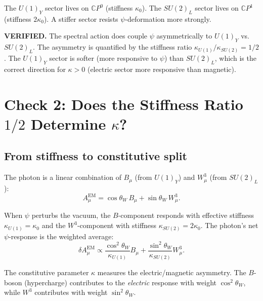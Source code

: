 \documentclass[aps,prd,twocolumn,superscriptaddress,nofootinbib]{revtex4-2}
\newcommand{\CP}{\mathbb{C}P}
\begin{document}
The $U(1)_Y$ sector lives on $\CP^0$ (stiffness $\kappa_0$).  The
$SU(2)_L$ sector lives on $\CP^1$ (stiffness $2\kappa_0$).  A stiffer
sector resists $\psi$-deformation more strongly.

\begin{tcolorbox}[colback=green!5!white, colframe=green!60!black, title=Verdict: Check 1]
\textbf{VERIFIED.}  The spectral action does couple $\psi$
asymmetrically to $U(1)_Y$ vs.\ $SU(2)_L$.  The asymmetry is
quantified by the stiffness ratio $\kappa_{U(1)}/\kappa_{SU(2)} = 1/2$.
The $U(1)_Y$ sector is softer (more responsive to $\psi$) than
$SU(2)_L$, which is the correct direction for $\kappa > 0$
(electric sector more responsive than magnetic).
\end{tcolorbox}


\section{Check 2: Does the Stiffness Ratio $1/2$ Determine $\kappa$?}
\label{sec:check2}

\subsection{From stiffness to constitutive split}

The photon is a linear combination of $B_\mu$ (from $U(1)_Y$) and
$W^3_\mu$ (from $SU(2)_L$):
\begin{equation}
A_\mu^{\mathrm{EM}} = \cos\theta_W\, B_\mu + \sin\theta_W\, W^3_\mu.
\end{equation}

When $\psi$ perturbs the vacuum, the $B$-component responds with
effective stiffness $\kappa_{U(1)} = \kappa_0$ and the $W^3$-component
with stiffness $\kappa_{SU(2)} = 2\kappa_0$.  The photon's net
$\psi$-response is the weighted average:
\begin{equation}
\delta A_\mu^{\mathrm{EM}} \propto
\frac{\cos^2\theta_W}{\kappa_{U(1)}} B_\mu
+ \frac{\sin^2\theta_W}{\kappa_{SU(2)}} W^3_\mu.
\end{equation}

The constitutive parameter $\kappa$ measures the electric/magnetic
asymmetry.  The $B$-boson (hypercharge) contributes to the
\emph{electric} response with weight $\cos^2\theta_W$, while $W^3$
contributes with weight $\sin^2\theta_W$.
\end{document}
